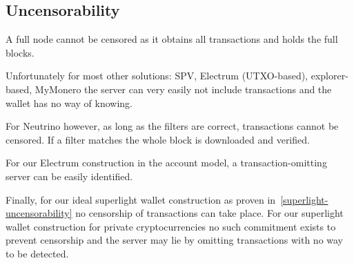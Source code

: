 \subsection{Uncensorability}
A full node cannot be censored as it obtains all transactions and holds the full blocks.

Unfortunately for most other solutions: SPV, Electrum (UTXO-based), explorer-based, MyMonero the server can very easily not include transactions and the wallet has no way of knowing.

For Neutrino however, as long as the filters are correct, transactions cannot be censored. If a filter matches the whole block is downloaded and verified.

For our Electrum construction in the account model, a transaction-omitting server can be easily identified.

Finally, for our ideal superlight wallet construction as proven in~\cref{superlight-uncensorability} no censorship of transactions can take place.
For our superlight wallet construction for private cryptocurrencies no such commitment exists to prevent censorship and the server may lie by omitting transactions with no way to be detected.
